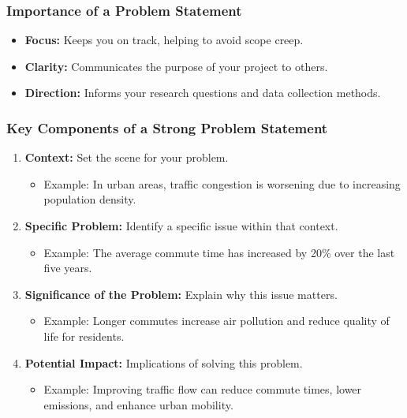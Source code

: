 \documentclass[aspectratio=169]{beamer}
\begin{document}
\begin{frame}[fragile]
    \frametitle{Importance of a Problem Statement}
    \begin{itemize}
        \item \textbf{Focus:} Keeps you on track, helping to avoid scope creep.
        \item \textbf{Clarity:} Communicates the purpose of your project to others.
        \item \textbf{Direction:} Informs your research questions and data collection methods.
    \end{itemize}
\end{frame}

\begin{frame}[fragile]
    \frametitle{Key Components of a Strong Problem Statement}
    \begin{enumerate}
        \item \textbf{Context:} Set the scene for your problem.
            \begin{itemize}
                \item Example: In urban areas, traffic congestion is worsening due to increasing population density.
            \end{itemize}
        \item \textbf{Specific Problem:} Identify a specific issue within that context.
            \begin{itemize}
                \item Example: The average commute time has increased by 20\% over the last five years.
            \end{itemize}
        \item \textbf{Significance of the Problem:} Explain why this issue matters.
            \begin{itemize}
                \item Example: Longer commutes increase air pollution and reduce quality of life for residents.
            \end{itemize}
        \item \textbf{Potential Impact:} Implications of solving this problem.
            \begin{itemize}
                \item Example: Improving traffic flow can reduce commute times, lower emissions, and enhance urban mobility.
            \end{itemize}
    \end{enumerate}
\end{frame}
\end{document}
